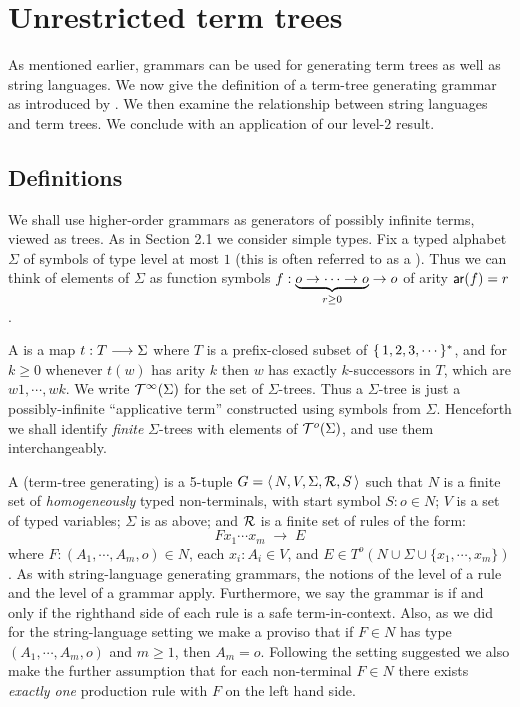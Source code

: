 \section{Unrestricted term trees}
As mentioned earlier, grammars can be used for generating term
trees as well as string languages. We now give the definition of a
term-tree generating grammar as introduced by \cite{KNU01, KNU02}.
We then examine the relationship between string languages and term
trees. We conclude with an application of our level-$2$
result.

\subsection{Definitions}

We shall use higher-order grammars as generators of possibly
infinite terms, viewed as trees. As in Section 2.1 we consider
simple types. Fix a typed alphabet $\Sigma$ of symbols of type
level at most $1$ (this is often referred to as a
). Thus we can think of elements of $\Sigma$
as function symbols $f : \underbrace{o \rightarrow \cdots \rightarrow
o}_{r\geq 0} \rightarrow o$ of arity ${\sf ar}(f) = r$.

A  is a map $t : T \longrightarrow \Sigma$ where $T$
is a prefix-closed subset of $\{\,{1, 2, 3, \cdots}\,\}^\ast$, and
for $k \geq 0$ whenever $t(w)$ has arity $k$ then $w$ has exactly
$k$-successors in $T$, which are $w1, \cdots, wk$. We write
${\cal T}^{\infty}(\Sigma)$ for the set of $\Sigma$-trees. Thus a
$\Sigma$-tree is just a possibly-infinite ``applicative term''
constructed using symbols from $\Sigma$. Henceforth we shall
identify \emph{finite} $\Sigma$-trees with elements of
${\cal T}^{o}(\Sigma)$, and use them interchangeably.

\begin{definition}\rm
A (term-tree generating)  is a 5-tuple $G =
\langle\,{N, V, \Sigma, {\cal R}, S}\,\rangle$ such that $N$ is a finite
set of \emph{homogeneously} typed non-terminals, with start symbol
${S : o} \in N$; $V$ is a set of typed variables; $\Sigma$ is as
above; and ${\cal R}$ is a finite set of rules of the form:
\[ F x_1 \cdots x_m \; \rightarrow \; E \]
where $F : (A_1, \cdots, A_m, o) \in N$, each ${x_i : A_i} \in V$,
and $E \in T^o(N \cup \Sigma \cup \{x_1, \cdots, x_m\})$. As with
string-language generating grammars, the notions of the level of a
rule and the level of a grammar apply. Furthermore, we say the
grammar is  if and only if the righthand side of
each rule is a safe term-in-context. Also, as we did for the
string-language setting we make a proviso that if $F \in N$ has
type $(A_1, \cdots, A_m, o)$ and $m \geq 1$, then $A_m = o$.
Following the setting suggested \cite{KNU02} we also make the
further assumption that for each non-terminal $F \in N$ there
exists \emph{exactly one} production rule with $F$ on the left
hand side.
\end{definition}

